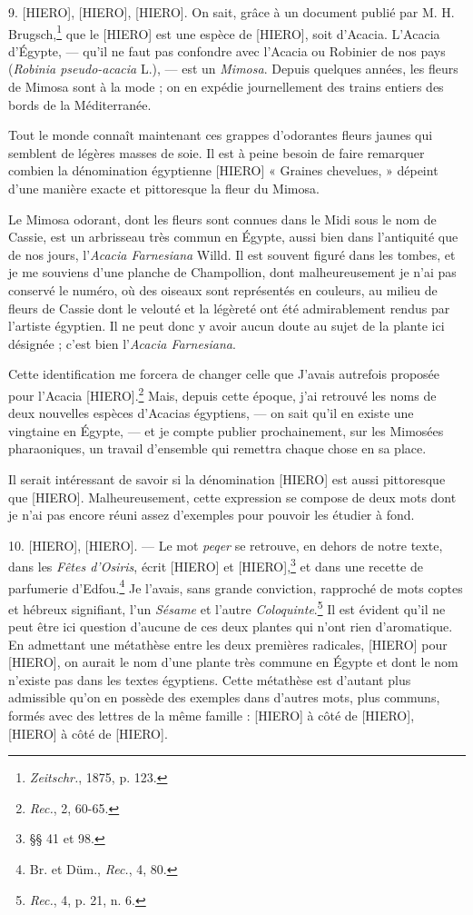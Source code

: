 \documentclass[a4paper, 11pt, oneside]{article}
\begin{document}
9. [HIERO], [HIERO], [HIERO]. On sait, grâce à un document publié par M. H. Brugsch,\footnote{\emph{Zeitschr.}, 1875, p. 123.} que le [HIERO] est une espèce de [HIERO], soit d'Acacia. L'Acacia d'Égypte, --- qu'il ne faut pas confondre avec l'Acacia ou Robinier de nos pays (\emph{Robinia pseudo-acacia} L.), --- est un \emph{Mimosa}. Depuis quelques années, les fleurs de Mimosa sont à la mode ; on en expédie journellement des trains entiers des bords de la Méditerranée.

Tout le monde connaît maintenant ces grappes d'odorantes fleurs jaunes qui semblent de légères masses de soie. Il est à peine besoin de faire remarquer combien la dénomination égyptienne [HIERO] « Graines chevelues, » dépeint d'une manière exacte et pittoresque la fleur du Mimosa.

Le Mimosa odorant, dont les fleurs sont connues dans le Midi sous le nom de Cassie, est un arbrisseau très commun en Égypte, aussi bien dans l'antiquité que de nos jours, l'\emph{Acacia Farnesiana} Willd. Il est souvent figuré dans les tombes, et je me souviens d'une planche de Champollion, dont malheureusement je n'ai pas conservé le numéro, où des oiseaux sont représentés en couleurs, au milieu de fleurs de Cassie dont le velouté et la légèreté ont été admirablement rendus par l'artiste égyptien. Il ne peut donc y avoir aucun doute au sujet de la plante ici désignée ; c'est bien l'\emph{Acacia Farnesiana}.

Cette identification me forcera de changer celle que J'avais autrefois proposée pour l'Acacia [HIERO].\footnote{\emph{Rec.}, 2, 60-65.} Mais, depuis cette époque, j'ai retrouvé les noms de deux nouvelles espèces d'Acacias égyptiens, --- on sait qu'il en existe une vingtaine en Égypte, --- et je compte publier prochainement, sur les Mimosées pharaoniques, un travail d'ensemble qui remettra chaque chose en sa place.

Il serait intéressant de savoir si la dénomination [HIERO] est aussi pittoresque que [HIERO]. Malheureusement, cette expression se compose de deux mots dont je n'ai pas encore réuni assez d'exemples pour pouvoir les étudier à fond.

10. [HIERO], [HIERO]. --- Le mot \emph{peqer} se retrouve, en dehors de notre texte, dans les \emph{Fêtes d'Osiris}, écrit [HIERO] et [HIERO],\footnote{§§ 41 et 98.} et dans une recette de parfumerie d'Edfou.\footnote{Br. et Düm., \emph{Rec.}, 4, 80.} Je l'avais, sans grande conviction, rapproché de mots coptes et hébreux signifiant, l'un \emph{Sésame} et l'autre \emph{Coloquinte}.\footnote{\emph{Rec.}, 4, p. 21, n. 6.} Il est évident qu'il ne peut être ici question d'aucune de ces deux plantes qui n'ont rien d'aromatique. En admettant une métathèse entre les deux premières radicales, [HIERO] pour [HIERO], on aurait le nom d'une plante très commune en Égypte et dont le nom n'existe pas dans les textes égyptiens. Cette métathèse est d'autant plus admissible qu'on en possède des exemples dans d'autres mots, plus communs, formés avec des lettres de la même famille : [HIERO] à côté de [HIERO], [HIERO] à côté de [HIERO].
\end{document}
